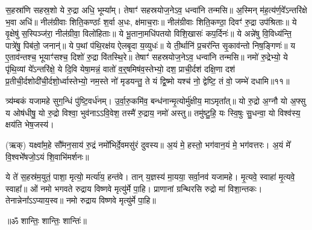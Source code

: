 स॒हस्रा॑णि सहस्र॒शो ये रु॒द्रा अधि॒ भूम्या᳚म्। तेषाꣳ॑ सहस्रयोज॒नेऽव॒ धन्वा॑नि तन्मसि॥ अ॒स्मिन् म॑ह॒त्य॑र्ण॒वे᳚\-ऽन्तरि॑क्षे भ॒वा अधि॑॥ नील॑ग्रीवाः शिति॒कण्ठाः᳚ श॒र्वा अ॒धः, क्ष॑माच॒राः॥ नील॑ग्रीवाः शिति॒कण्ठा॒ दिवꣳ॑ रु॒द्रा उप॑श्रिताः॥ ये वृ॒क्षेषु॑ स॒स्पिञ्ज॑रा॒ नील॑ग्रीवा॒ विलो॑हिताः॥ ये भू॒ताना॒मधि॑पतयो विशि॒खासः॑ कप॒र्दिनः॑॥ ये अन्ने॑षु वि॒विध्य॑न्ति॒ पात्रे॑षु॒ पिब॑तो॒ जनान्॑॥ ये प॒थां प॑थि॒रक्ष॑य ऐलबृ॒दा य॒व्युधः॑॥ ये ती॒र्थानि॑ प्र॒चर॑न्ति सृ॒काव॑न्तो निष॒ङ्गिणः॑॥ य ए॒ताव॑न्तश्च॒ भूयाꣳ॑सश्च॒ दिशो॑ रु॒द्रा वि॑तस्थि॒रे॥ तेषाꣳ॑ सहस्रयोज॒नेऽव॒ धन्वा॑नि तन्मसि॥ नमो॑ रु॒द्रेभ्यो॒ ये पृ॑थि॒व्यां ये᳚ऽन्तरि॑क्षे॒ ये दि॒वि येषा॒मन्नं॒ वातो॑ व॒र्॒‌षमिष॑व॒स्तेभ्यो॒ दश॒ प्राची॒र्दश॑ दक्षि॒णा दश॑ प्र॒तीची॒र्दशो\-दी॑ची॒र्दशो॒र्ध्वास्तेभ्यो॒ नम॒स्ते नो॑ मृडयन्तु॒ ते यं द्वि॒ष्मो यश्च॑ नो॒ द्वेष्टि॒ तं वो॒ जम्भे॑ दधामि॥११॥ 

त्र्य॑म्बकं यजामहे सुग॒न्धिं पु॑ष्टि॒वर्ध॑नम्। उ॒र्वा॒रु॒कमि॑व॒ बन्ध॑नान्मृ॒त्योर्मु॑क्षीय॒ माऽमृता᳚त्॥ यो रु॒द्रो अ॒ग्नौ यो अ॒फ्सु य ओष॑धीषु॒ यो रु॒द्रो विश्वा॒ भुव॑नाऽऽवि॒वेश॒ तस्मै॑ रु॒द्राय॒ नमो॑ अस्तु॥ तमु॑ष्टु॒हि॒ यः स्वि॒षुः सु॒धन्वा॒ यो विश्व॑स्य॒ क्षय॑ति भेष॒जस्य॑। 

(ऋक्)   यक्ष्वा᳚म॒हे सौ᳚मन॒साय॑ रु॒द्रं नमो᳚भिर्दे॒वमसु॑रं दुवस्य॥ अ॒यं मे॒ हस्तो॒ भग॑वान॒यं मे॒ भग॑वत्तरः। अ॒यं मे᳚ वि॒श्वभे᳚षजो॒ऽयं शि॒वाभि॑मर्शनः॥

ये ते॑ स॒हस्र॑म॒युतं॒ पाशा॒ मृत्यो॒ मर्त्या॑य॒ हन्त॑वे। तान् य॒ज्ञस्य॑ मा॒यया॒ सर्वा॒नव॑ यजामहे। मृ॒त्यवे॒ स्वाहा॑ मृ॒त्यवे॒ स्वाहा᳚॥ ओं नमो भगवते रुद्राय विष्णवे मृत्यु॑र्मे पा॒हि। प्राणानां ग्रन्थिरसि रुद्रो मा॑ विशा॒न्तकः। तेनान्नेना᳚\-ऽऽप्याय॒स्व॥ नमो रुद्राय विष्णवे मृत्यु॑र्मे पा॒हि॥
 
\centerline{॥ॐ शान्तिः॒ शान्तिः॒ शान्तिः॑॥}


